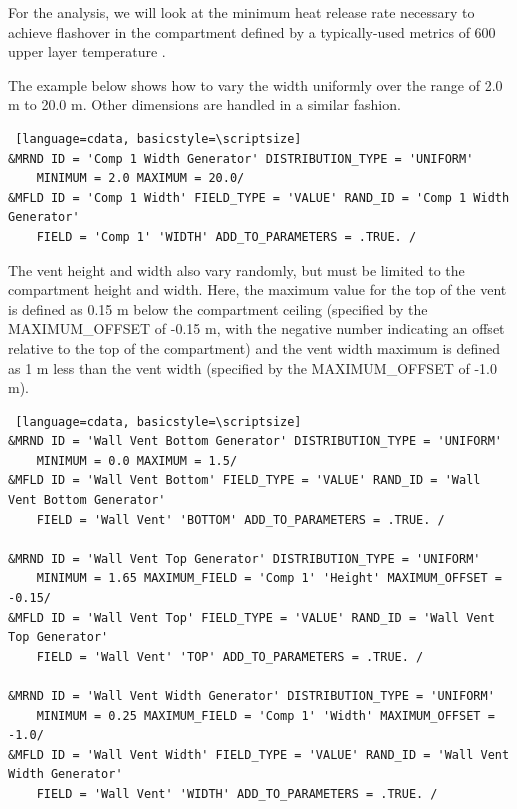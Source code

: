\documentclass[12pt,twoside]{book}
\begin{document}
For the analysis, we will look at the minimum heat release rate necessary to achieve flashover in the compartment defined by a typically-used metrics of 600 \degc upper layer temperature \cite{Valid:Peacock_Flashover_1} \cite{Valid:Peacock_Flashover_2}.

The example below shows how to vary the width uniformly over the range of 2.0 m to 20.0 m. Other dimensions are handled in a similar fashion.

\vspace{\baselineskip}
\begin{lstlisting} [language=cdata, basicstyle=\scriptsize]
&MRND ID = 'Comp 1 Width Generator' DISTRIBUTION_TYPE = 'UNIFORM'
	MINIMUM = 2.0 MAXIMUM = 20.0/
&MFLD ID = 'Comp 1 Width' FIELD_TYPE = 'VALUE' RAND_ID = 'Comp 1 Width Generator' 
	FIELD = 'Comp 1' 'WIDTH' ADD_TO_PARAMETERS = .TRUE. /
\end{lstlisting}

The vent height and width also vary randomly, but must be limited to the compartment height and width. Here, the maximum value for the top of the vent is defined as 0.15 m below the compartment ceiling (specified by the {\ct MAXIMUM\_OFFSET} of -0.15 m, with the negative number indicating an offset relative to the top of the compartment) and the vent width maximum is defined as 1 m less than the vent width (specified by the {\ct MAXIMUM\_OFFSET} of -1.0 m).

\vspace{\baselineskip}
\begin{lstlisting} [language=cdata, basicstyle=\scriptsize]
&MRND ID = 'Wall Vent Bottom Generator' DISTRIBUTION_TYPE = 'UNIFORM'  
	MINIMUM = 0.0 MAXIMUM = 1.5/
&MFLD ID = 'Wall Vent Bottom' FIELD_TYPE = 'VALUE' RAND_ID = 'Wall Vent Bottom Generator' 
	FIELD = 'Wall Vent' 'BOTTOM' ADD_TO_PARAMETERS = .TRUE. /

&MRND ID = 'Wall Vent Top Generator' DISTRIBUTION_TYPE = 'UNIFORM'
	MINIMUM = 1.65 MAXIMUM_FIELD = 'Comp 1' 'Height' MAXIMUM_OFFSET = -0.15/
&MFLD ID = 'Wall Vent Top' FIELD_TYPE = 'VALUE' RAND_ID = 'Wall Vent Top Generator' 
	FIELD = 'Wall Vent' 'TOP' ADD_TO_PARAMETERS = .TRUE. /

&MRND ID = 'Wall Vent Width Generator' DISTRIBUTION_TYPE = 'UNIFORM'
    MINIMUM = 0.25 MAXIMUM_FIELD = 'Comp 1' 'Width' MAXIMUM_OFFSET = -1.0/
&MFLD ID = 'Wall Vent Width' FIELD_TYPE = 'VALUE' RAND_ID = 'Wall Vent Width Generator' 
	FIELD = 'Wall Vent' 'WIDTH' ADD_TO_PARAMETERS = .TRUE. /
\end{lstlisting}
\end{document}
